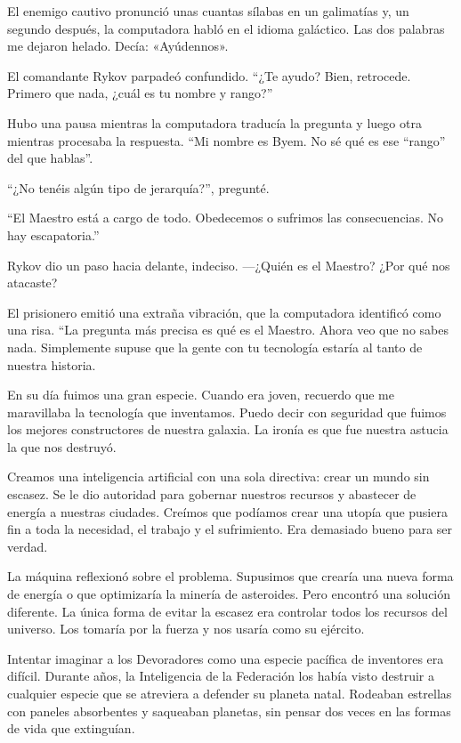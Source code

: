 El enemigo cautivo pronunció unas cuantas sílabas en un galimatías y, un segundo después, la computadora habló en el idioma galáctico. Las dos palabras me dejaron helado. Decía: «Ayúdennos».

El comandante Rykov parpadeó confundido. “¿Te ayudo? Bien, retrocede. Primero que nada, ¿cuál es tu nombre y rango?”

Hubo una pausa mientras la computadora traducía la pregunta y luego otra mientras procesaba la respuesta. “Mi nombre es Byem. No sé qué es ese “rango” del que hablas”.

“¿No tenéis algún tipo de jerarquía?”, pregunté.

“El Maestro está a cargo de todo. Obedecemos o sufrimos las consecuencias. No hay escapatoria.”

Rykov dio un paso hacia delante, indeciso. —¿Quién es el Maestro? ¿Por qué nos atacaste?

El prisionero emitió una extraña vibración, que la computadora identificó como una risa. “La pregunta más precisa es qué es el Maestro. Ahora veo que no sabes nada. Simplemente supuse que la gente con tu tecnología estaría al tanto de nuestra historia.

En su día fuimos una gran especie. Cuando era joven, recuerdo que me maravillaba la tecnología que inventamos. Puedo decir con seguridad que fuimos los mejores constructores de nuestra galaxia. La ironía es que fue nuestra astucia la que nos destruyó.

Creamos una inteligencia artificial con una sola directiva: crear un mundo sin escasez. Se le dio autoridad para gobernar nuestros recursos y abastecer de energía a nuestras ciudades. Creímos que podíamos crear una utopía que pusiera fin a toda la necesidad, el trabajo y el sufrimiento. Era demasiado bueno para ser verdad.

La máquina reflexionó sobre el problema. Supusimos que crearía una nueva forma de energía o que optimizaría la minería de asteroides. Pero encontró una solución diferente. La única forma de evitar la escasez era controlar todos los recursos del universo. Los tomaría por la fuerza y nos usaría como su ejército.

Intentar imaginar a los Devoradores como una especie pacífica de inventores era difícil. Durante años, la Inteligencia de la Federación los había visto destruir a cualquier especie que se atreviera a defender su planeta natal. Rodeaban estrellas con paneles absorbentes y saqueaban planetas, sin pensar dos veces en las formas de vida que extinguían.

